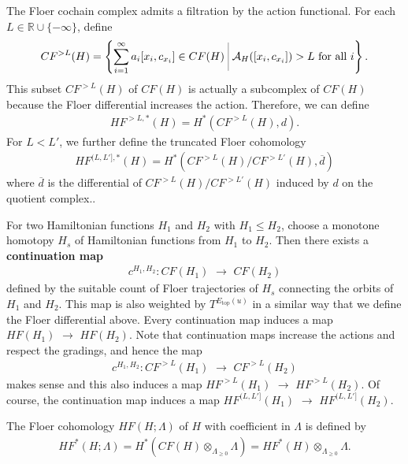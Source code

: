 \documentclass[12pt]{amsart}
\def\bigmid{\ \rule[-3.5mm]{0.1mm}{9mm}\ }
\theoremstyle{definition}
\newcommand{\RR}{{\mathbb R}}
\newcommand{\ton}{{\otimes_{\Lambda_{\geq 0}}}}
\newcommand{\lr}{{\,\,\longrightarrow\,\,}}
\begin{document}
\vspace{0.2 cm}

The Floer cochain complex admits a filtration by the action functional. For each $L \in \RR\cup \{-\infty\}$, define
\begin{align*}
    CF^{> L}(H) = \left\{ \sum_{i=1}^{\infty}a_i [x_i, c_{x_i}] \in CF(H) \bigmid \mathcal{A}_H([x_i, c_{x_i}]) > L\,\,\text{for all}\,\,i \right\}.
\end{align*}
This subset $CF^{> L}(H)$ of $CF(H)$ is actually a subcomplex of $CF(H)$ because the Floer differential increases the action. Therefore, we can define
\begin{align*}
    HF^{> L, *} (H) = H^* (CF^{> L}(H), d).
\end{align*}
For $L<L'$, we further define the truncated Floer cohomology
\begin{align*}
    HF^{(L,L'],*}(H) = H^*\left( CF^{>L}(H) / CF^{>L'}(H), \overline{d} \right)
\end{align*}
where $\overline{d}$ is the differential of $CF^{>L}(H) / CF^{>L'}(H)$ induced by $d$ on the quotient complex..

\vspace{0.2 cm}

For two Hamiltonian functions $H_1$ and $H_2$ with $H_1 \leq H_2$, choose a monotone homotopy $H_s$ of Hamiltonian functions from $H_1$ to $H_2$. Then there exists a \textbf{continuation map} 
\begin{align*}
   c^{H_1, H_2} : CF(H_1) \lr CF(H_2)
\end{align*}
defined by the suitable count of Floer trajectories of $H_s$ connecting the orbits of $H_1$ and $H_2$. This  map is also weighted by $T^{E_{\text{top}}(u)}$ in a similar way that we define the Floer differential above. Every continuation map induces a map $HF(H_1) \lr HF(H_2)$. Note that continuation maps increase the actions and respect the gradings, and hence the map
\begin{align*}
    c^{H_1, H_2} : CF^{>L}(H_1) \lr CF^{>L}(H_2)
\end{align*}
makes sense and this also induces a map $HF^{>L}(H_1) \lr HF^{>L}(H_2)$. Of course, the continuation map induces a map $HF^{(L,L']}(H_1) \lr HF^{(L,L']}(H_2)$.

\vspace{0.2 cm}

The Floer cohomology $HF(H;\Lambda)$ of $H$ with coefficient in $\Lambda$ is defined by
\begin{align*}
    HF^*(H;\Lambda) = H^*\left( CF(H) \ton \Lambda \right) = HF^*(H)\ton \Lambda.
\end{align*}
\end{document}
